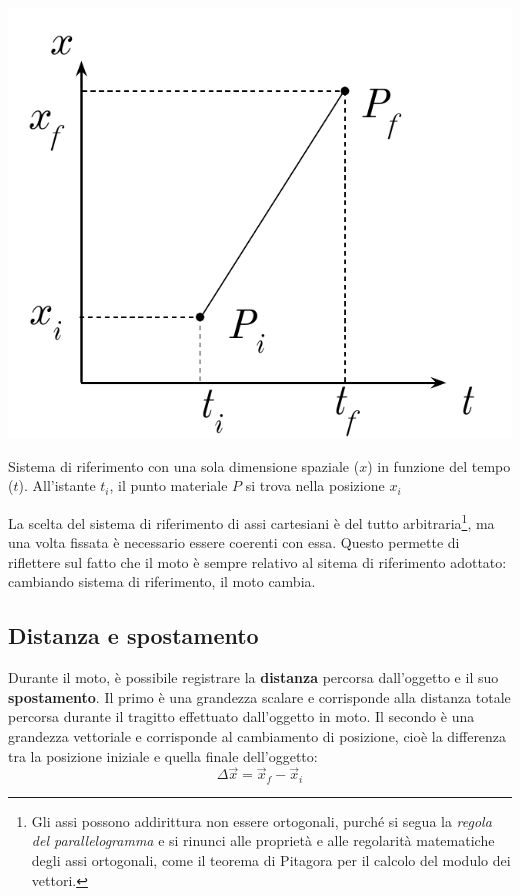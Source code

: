 \begin{marginfigure}
    \centering
    \includegraphics[width = \marginparwidth]{figures/puntomateriale.pdf}
    \caption{Sistema di riferimento con una sola dimensione spaziale ($x$)
    in funzione del tempo ($t$). All'istante $t_i$, il punto materiale $P$
    si trova nella posizione $x_i$}
    \label{point}
\end{marginfigure}

La scelta del sistema di riferimento di assi cartesiani è del tutto arbitraria\footnote{
Gli assi possono addirittura non essere ortogonali, purché si segua la \textit{regola del
parallelogramma} e si rinunci alle proprietà e alle regolarità matematiche degli
assi ortogonali, come il teorema di Pitagora per il calcolo del modulo dei
vettori.}, ma una volta fissata è necessario essere coerenti con essa.
Questo permette di riflettere sul fatto che il moto è sempre relativo al sitema di
riferimento adottato: cambiando sistema di riferimento, il moto cambia.


\subsection{Distanza e spostamento}
Durante il moto, è possibile registrare la \textbf{distanza} percorsa
dall'oggetto e il suo \textbf{spostamento}. Il primo è una grandezza
scalare e corrisponde alla distanza totale percorsa durante il tragitto
effettuato dall'oggetto in moto. Il secondo è una grandezza vettoriale e
corrisponde al cambiamento di posizione,
cioè la differenza tra la posizione iniziale e quella finale dell'oggetto:
\[ \Delta \overrightarrow{x} = \overrightarrow{x}_f - \overrightarrow{x}_i \]


